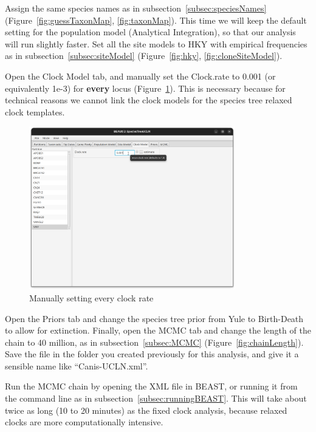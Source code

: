 \documentclass[12pt]{article}
\begin{document}
Assign the same species names as in
subsection~\ref{subsec:speciesNames} (Figure~\ref{fig:guessTaxonMap}, \ref{fig:taxonMap}). This time
we will keep the default setting for the population model (Analytical Integration), so that our analysis will run slightly faster. Set all
the site models to HKY with empirical frequencies as in
subsection~\ref{subsec:siteModel} (Figure~\ref{fig:hky}, \ref{fig:cloneSiteModel}).

Open the Clock Model tab, and manually set the Clock.rate to 0.001 (or
equivalently 1e-3) for \textbf{every} locus (Figure~\ref{fig:uclnClockRates}).
This is necessary because for technical reasons we cannot link the clock
models for the species tree relaxed clock templates.

\begin{figure}[htb!]
\centering
\includegraphics[width=0.8\textwidth]{figures/uclnClockRates.png}
\caption
{Manually setting every clock rate}
\label{fig:uclnClockRates}
\end{figure}

Open the Priors tab and change the species tree prior from Yule to Birth-Death
to allow for extinction. Finally, open the MCMC tab and change the length of
the chain to 40 million, as in subsection~\ref{subsec:MCMC}
(Figure~\ref{fig:chainLength}). Save the file in the folder you created
previously for this analysis, and give it a sensible name like ``Canis-UCLN.xml''.

Run the MCMC chain by opening the XML file in BEAST, or running it from
the command line as in subsection~\ref{subsec:runningBEAST}. This will
take about twice as long (10 to 20 minutes) as the fixed clock analysis,
because relaxed clocks are more computationally intensive.
\end{document}
